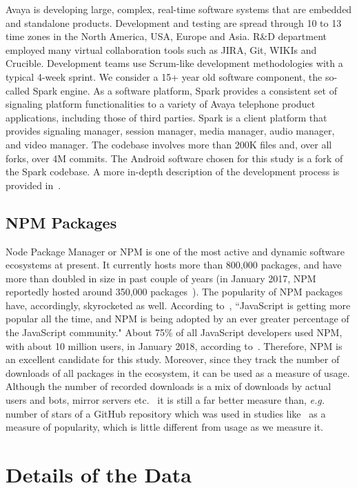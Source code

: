 \documentclass[smallextended]{svjour3}       %
\begin{document}
Avaya is developing large, complex, real-time software systems that
are embedded and standalone products. Development and testing are
spread through 10 to 13 time zones in the North America, USA, Europe
and Asia. R\&D department employed many virtual collaboration tools
such as JIRA, Git, WIKIs and Crucible. Development teams use
Scrum-like development methodologies with a typical 4-week
sprint. We consider a 15+ year old software component, the so-called
Spark engine.  As a software platform, Spark provides a consistent
set of signaling platform functionalities to a variety of Avaya
telephone product applications, including those of third parties.
Spark is a client platform that provides signaling manager, session
manager, media manager, audio manager, and video manager. The
codebase involves more than 200K files and, over all forks, over 4M
commits.  The Android software chosen for this study is a fork of
the Spark codebase. A more in-depth description of the development
process is provided in~\cite{amhp14}.

\subsection{NPM Packages}
Node Package Manager or NPM is one of the most active and dynamic software ecosystems at present. It currently hosts more than 800,000 packages, and have more than doubled in size in past couple of years (in January 2017, NPM reportedly hosted around 350,000 packages~\cite{npmpkg}). The popularity of NPM packages have, accordingly, skyrocketed as well. According to~\cite{npmpop}, ``JavaScript is getting more popular all the time, and NPM is being adopted by an ever greater percentage of the JavaScript community." About 75\% of all JavaScript developers used NPM, with about 10 million users, in January 2018, according to~\cite{npmpop}. Therefore, NPM is an excellent candidate for this study. Moreover, since they track the number of downloads of all packages in the ecosystem, it can be used as a  measure of usage. Although the number of recorded downloads is a mix of downloads by actual users and bots, mirror servers etc.~\cite{npmdl} it is still a far better measure than, \emph{e.g.} number of stars of a GitHub repository which was used in studies like~\cite{borges2016understanding} as a measure of popularity, which is little different from usage as we measure it.



\section{Details of the Data}\label{s:data}
\end{document}
